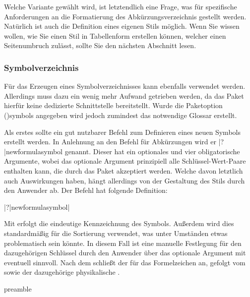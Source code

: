 \documentclass[%
  english,ngerman,%
  cdgeometry=no,DIV=12,%
  cd=false,cdfont=false,cdtitle=true,%
  headings=normal,%
  automark,%
  listof=toc,%
]{tudscrartcl}
\begin{document}
Welche Variante gewählt wird, ist letztendlich eine Frage, was für spezifische 
Anforderungen an die Formatierung des Abkürzungsverzeichnis gestellt werden. 
Natürlich ist auch die Definition eines eigenen Stils möglich. Wenn Sie wissen 
wollen, wie Sie einen Stil in Tabellenform erstellen können, welcher einen 
Seitenumbruch zulässt, sollte Sie den nächsten Abschnitt lesen.



\subsubsection{Symbolverzeichnis}

Für das Erzeugen eines Symbolverzeichnisses kann ebenfalls  
verwendet werden. Allerdings muss dazu ein wenig mehr Aufwand getrieben werden, 
da das Paket hierfür keine dedizierte Schnittstelle bereitstellt. Wurde die 
Paketoption \Option(){symbols} angegeben wird jedoch 
zumindest das notwendige Glossar erstellt.

Als erstes sollte ein gut nutzbarer Befehl zum Definieren eines neuen Symbols 
erstellt werden. In Anlehnung an den Befehl für Abkürzungen  
wird er \Macro|?|{newformulasymbol} genannt. Dieser hat ein optionales und vier 
obligatorische Argumente, wobei das optionale Argument prinzipiell alle 
Schlüssel-Wert-Paare enthalten kann, die durch das Paket  
akzeptiert werden. Welche davon letztlich auch Auswirkungen haben, hängt 
allerdings von der Gestaltung des Stils durch den Anwender ab. Der Befehl hat 
folgende Definition:
%
\begin{quoting}
\Macro|?|{newformulasymbol|%
  \OList{}}
\end{quoting}

Mit  erfolgt die eindeutige Kennzeichnung des Symbols. Außerdem 
wird dies standardmäßig für die Sortierung verwendet, was unter Umständen etwas
problematisch sein könnte. In diesem Fall ist eine manuelle Festlegung für den 
dazugehörigen Schlüssel durch den Anwender über das optionale Argument mit 
 eventuell sinnvoll. Nach dem  
schließt der  für das Formelzeichen an, gefolgt vom  
sowie der dazugehörige physikalische .
%
\CodeHook{\let\newcommand\renewcommand}
\begin{Code}[input]{preamble}
\newcommand*\newformulasymbol[5][]{%
  \newglossaryentry{#2}{%
    type=symbols,%
    name={#3},%
    description={\nopostdesc},%
    symbol={\ensuremath{#4}},%
    user1={\ensuremath{\mathrm{#5}}},%
    sort={#2},%
    #1%
  }%
}

\end{Code}
\end{document}
